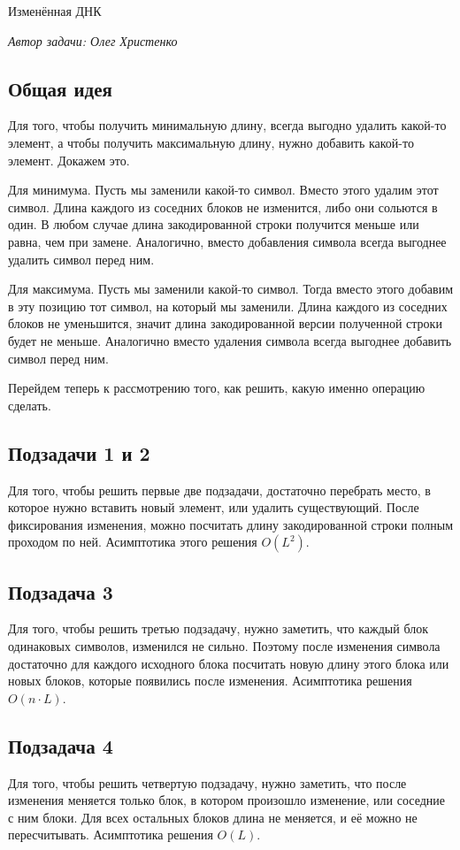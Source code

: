\begin{tutorial}{Изменённая ДНК}

\medskip
\textit{Автор задачи: Олег Христенко}
\medskip

\subsection*{Общая идея}
Для того, чтобы получить минимальную длину, всегда выгодно удалить какой-то элемент, а чтобы получить максимальную длину, нужно добавить какой-то элемент. Докажем это. 

Для минимума. Пусть мы заменили какой-то символ. Вместо этого удалим этот символ. Длина каждого из соседних блоков не изменится, либо они сольются в один. В любом случае длина закодированной строки получится меньше или равна, чем при замене. Аналогично, вместо добавления символа всегда выгоднее удалить символ перед ним.

Для максимума. Пусть мы заменили какой-то символ. Тогда вместо этого добавим в эту позицию тот символ, на который мы заменили. Длина каждого из соседних блоков не уменьшится, значит длина закодированной версии полученной строки будет не меньше. Аналогично вместо удаления символа всегда выгоднее добавить символ перед ним.

Перейдем теперь к рассмотрению того, как решить, какую именно операцию сделать.

\subsection*{Подзадачи 1 и 2}
Для того, чтобы решить первые две подзадачи, достаточно перебрать место, в которое нужно вставить новый элемент, или удалить существующий. После фиксирования изменения, можно посчитать длину закодированной строки полным проходом по ней. Асимптотика этого решения $O(L^2)$.

\subsection*{Подзадача 3}
Для того, чтобы решить третью подзадачу, нужно заметить, что каждый блок одинаковых символов, изменился не сильно. Поэтому после изменения символа достаточно для каждого исходного блока посчитать новую длину этого блока или новых блоков, которые появились после изменения. Асимптотика решения $O(n \cdot L)$.

\subsection*{Подзадача 4}
Для того, чтобы решить четвертую подзадачу, нужно заметить, что после изменения меняется только блок, в котором произошло изменение, или соседние с ним блоки. Для всех остальных блоков длина не меняется, и её можно не пересчитывать. Асимптотика решения $O(L)$.


\end{tutorial}
